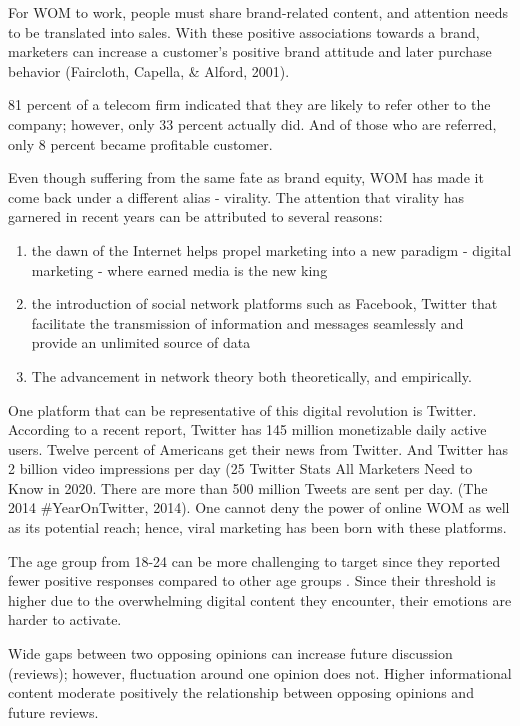 \documentclass[
]{book}
\providecommand{\tightlist}{%
  \setlength{\itemsep}{0pt}\setlength{\parskip}{0pt}}
\begin{document}
For WOM to work, people must share brand-related content, and attention needs to be translated into sales. With these positive associations towards a brand, marketers can increase a customer's positive brand attitude and later purchase behavior (Faircloth, Capella, \& Alford, 2001).

81 percent of a telecom firm indicated that they are likely to refer other to the company; however, only 33 percent actually did. And of those who are referred, only 8 percent became profitable customer. \citep{kumar_2007}

Even though suffering from the same fate as brand equity, WOM has made it come back under a different alias - virality. The attention that virality has garnered in recent years can be attributed to several reasons:

\begin{enumerate}
\def\labelenumi{(\arabic{enumi})}
\tightlist
\item
  the dawn of the Internet helps propel marketing into a new paradigm - digital marketing - where earned media is the new king
\item
  the introduction of social network platforms such as Facebook, Twitter that facilitate the transmission of information and messages seamlessly and provide an unlimited source of data
\item
  The advancement in network theory both theoretically, and empirically.
\end{enumerate}

One platform that can be representative of this digital revolution is Twitter. According to a recent report, Twitter has 145 million monetizable daily active users. Twelve percent of Americans get their news from Twitter. And Twitter has 2 billion video impressions per day (25 Twitter Stats All Marketers Need to Know in 2020. There are more than 500 million Tweets are sent per day. (The 2014 \#YearOnTwitter, 2014). One cannot deny the power of online WOM as well as its potential reach; hence, viral marketing has been born with these platforms.

The age group from 18-24 can be more challenging to target since they reported fewer positive responses compared to other age groups \citep{Libert_2014}. Since their threshold is higher due to the overwhelming digital content they encounter, their emotions are harder to activate.

Wide gaps between two opposing opinions can increase future discussion (reviews); however, fluctuation around one opinion does not. Higher informational content moderate positively the relationship between opposing opinions and future reviews. \citep{Nagle_2014}
\end{document}

